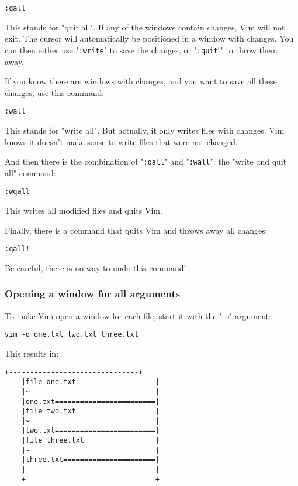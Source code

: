  \begin{Verbatim}[samepage=true]
 :qall
 \end{Verbatim}

This stands for "quit all".
If any of the windows contain changes, Vim will not exit.
The cursor will automatically be positioned in a window with changes.
You can then either use "\verb!:write!" to save the changes, or "\verb!:quit!!" to throw them away.

If you know there are windows with changes, and you want to save all these changes, use this command:

 \begin{Verbatim}[samepage=true]
 :wall
 \end{Verbatim}

This stands for "write all".
But actually, it only writes files with changes.
Vim knows it doesn't make sense to write files that were not changed.

And then there is the combination of "\verb!:qall!" and "\verb!:wall!": the "write and quit all" command:

 \begin{Verbatim}[samepage=true]
 :wqall
 \end{Verbatim}

This writes all modified files and quits Vim.

Finally, there is a command that quits Vim and throws away all changes:

 \begin{Verbatim}[samepage=true]
 :qall!
 \end{Verbatim}

Be careful, there is no way to undo this command!
\subsubsection{Opening a window for all arguments}
To make Vim open a window for each file, start it with the "-o" argument:

 \begin{Verbatim}[samepage=true]
 vim -o one.txt two.txt three.txt
 \end{Verbatim}

This results in:

\begin{Verbatim}[samepage=true]
    +-------------------------------+
    |file one.txt                   |
    |~                              |
    |one.txt========================|
    |file two.txt                   |
    |~                              |
    |two.txt========================|
    |file three.txt                 |
    |~                              |
    |three.txt======================|
    |                               |
    +-------------------------------+
\end{Verbatim}

